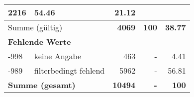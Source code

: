 \begin{longtable}{lXrrr}
       \num{2216} &
       \num[round-mode=places,round-precision=2]{54,46} &
         \num[round-mode=places,round-precision=2]{21,12} \\
     \midrule
     \multicolumn{2}{l}{Summe (gültig)} &
       \textbf{\num{4069}} &
     \textbf{100} &
       \textbf{\num[round-mode=places,round-precision=2]{38,77}} \\
     \multicolumn{5}{l}{\textbf{Fehlende Werte}}\\
       -998 &
       keine Angabe &
         \num{463} &
        - &
         \num[round-mode=places,round-precision=2]{4,41} \\
       -989 &
       filterbedingt fehlend &
         \num{5962} &
        - &
         \num[round-mode=places,round-precision=2]{56,81} \\
     \midrule
     \multicolumn{2}{l}{\textbf{Summe (gesamt)}} &
          \textbf{\num{10494}} &
        \textbf{-} &
        \textbf{100} \\
     \bottomrule
     \end{longtable}
     
